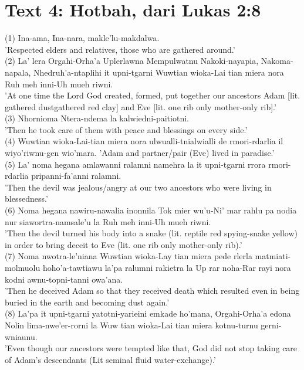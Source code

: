 \documentclass[10pt]{article}
\begin{document}
\section*{Text 4: Hotbah, dari Lukas 2:8}
(1) Ina-ama, Ina-nara, makle'lu-makdalwa.\\
'Respected elders and relatives, those who are gathered around.'\\
(2) La' lera Orgahi-Orha'a Uplerlawna Mempulwatnu Nakoki-nayapia, Nakoma-napala, Nhedruh'a-ntaplihi it upni-tgarni Wuwtian wioka-Lai tian miera nora Ruh meh inni-Uh mueh riwni.\\[0pt]
'At one time the Lord God created, formed, put together our ancestors Adam [lit. gathered dustgathered red clay] and Eve [lit. one rib only mother-only rib].'\\
(3) Nhornioma Ntera-ndema la kalwiedni-paitiotni.\\
'Then he took care of them with peace and blessings on every side.'\\
(4) Wuwtian wioka-Lai-tian miera nora ulwualli-tnialwialli de rmori-rdarlia il wiyo'riwnu-gen wio'mara. 'Adam and partner/pair (Eve) lived in paradise.'\\
(5) La' noma hegana amlawanni ralamni namehra la it upni-tgarni rrora rmori-rdarlia pripanni-fa'anni ralamni.\\
'Then the devil was jealous/angry at our two ancestors who were living in blessedness.'\\
(6) Noma hegana nawiru-nawalia inonnila Tok mier wu'u-Ni' mar rahlu pa nodia nur siawortra-namsale'u la Ruh meh inni-Uh mueh riwni.\\
'Then the devil turned his body into a snake (lit. reptile red spying-snake yellow) in order to bring deceit to Eve (lit. one rib only mother-only rib).'\\
(7) Noma nwotra-le'niana Wuwtian wioka-Lay tian miera pede rlerla matmiati-molmuolu hoho'a-tawtiawu la'pa ralumni rakietra la Up rar noha-Rar rayi nora kodni awnu-topni-tanni owa'ana.\\
'Then he deceived Adam so that they received death which resulted even in being buried in the earth and becoming dust again.'\\
(8) La'pa it upni-tgarni yatotni-yarieini emkade ho'mana, Orgahi-Orha'a edona Nolin lima-nwe'er-rorni la Wuw tian wioka-Lai tian miera kotnu-turnu gerni-wniaunu.\\
'Even though our ancestors were tempted like that, God did not stop taking care of Adam's descendants (Lit seminal fluid water-exchange).'\\
\end{document}
